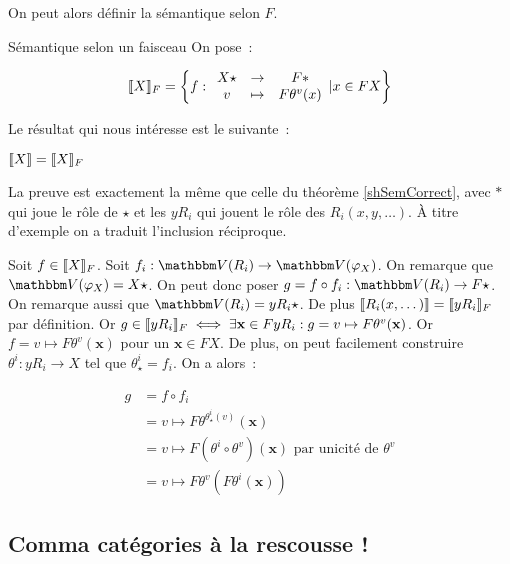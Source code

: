 On peut alors définir la sémantique selon $F$.

\begin{defi}{Sémantique selon un faisceau}
    On pose~:

    \[\llbracket {X} \rrbracket_F = \left\{f:\begin{array}{ccc}
        X\star & \rightarrow & F\ast \\
        v      & \mapsto     & F\theta^v(x)
    \end{array} | x\in F X\right\}\]
\end{defi}

Le résultat qui nous intéresse est le suivante~:

\begin{prop}
    $\llbracket {X} \rrbracket = \llbracket {X} \rrbracket_F$
\end{prop}

\begin{pv}
    La preuve est exactement la même que celle du théorème \ref{shSemCorrect},
    avec $\ast$ qui joue le rôle de $\star$ et les $yR_i$ qui jouent le rôle
    des $R_i(x, y, \dots)$. À titre d'exemple on a traduit l'inclusion
    réciproque.

    \boxed{\supseteq} Soit $f\in\llbracket {X} \rrbracket_F$. Soit $f_i : \V(R_i)\rightarrow\V(\phi_X)$.
    On remarque que $\V(\phi_X) = X\star$. On peut donc poser
    $g = f\circ f_i : \V(R_i)\rightarrow F\star$. On remarque aussi que
    $\V(R_i) = yR_i\star$. De plus $\llbracket {R_i(x, \dots)} \rrbracket = \llbracket {yR_i} \rrbracket_F$ par définition.
    Or $g\in\llbracket {yR_i} \rrbracket_F\iff
    \exists \mathbf{x}\in F y R_i: g = v\mapsto F\theta^v(\mathbf{x})$. Or
    $f = v\mapsto F\theta^v(\mathbf{x})$ pour un $\mathbf{x}\in F X$. De plus,
    on peut facilement construire $\theta^i : yR_i\rightarrow X$ tel que
    $\theta^i_\star = f_i$. On a alors~:

    \begin{align*}
        g &= f\circ f_i \\
          &= v\mapsto F\theta^{\theta^i_\star(v)}(\mathbf{x}) \\
          &= v\mapsto F(\theta^i\circ\theta^v)(\mathbf{x})\text{ par unicité de $\theta^v$} \\
          &= v\mapsto F\theta^v(F\theta^i(\mathbf{x}))
    \end{align*}
\end{pv}

\subsection{Comma catégories à la rescousse !}

